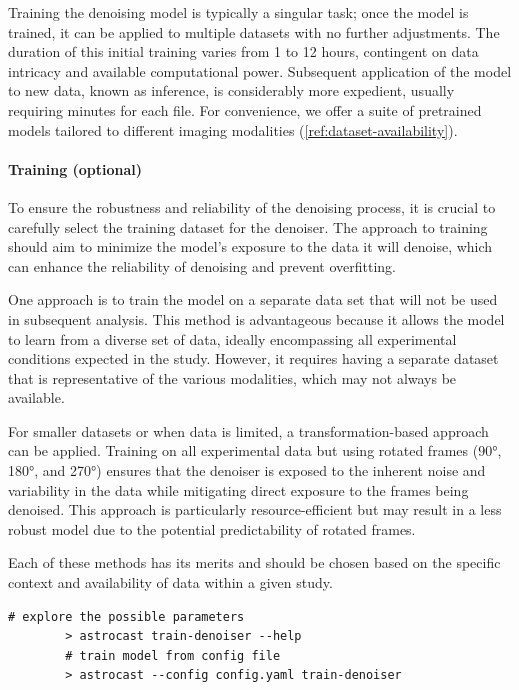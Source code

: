 \documentclass[utf8]{FrontiersinHarvard}
\begin{document}
    Training the denoising model is typically a singular task; once the model is trained, it can be applied to multiple datasets with no further adjustments. The duration of this initial training varies from 1 to 12 hours, contingent on data intricacy and available computational power. Subsequent application of the model to new data, known as inference, is considerably more expedient, usually requiring minutes for each file. For convenience, we offer a suite of pretrained models tailored to different imaging modalities (\ref{ref:dataset-availability}).

    \paragraph{Training (optional)}

    To ensure the robustness and reliability of the denoising process, it is crucial to carefully select the training dataset for the denoiser. The approach to training should aim to minimize the model's exposure to the data it will denoise, which can enhance the reliability of denoising and prevent overfitting.

    One approach is to train the model on a separate data set that will not be used in subsequent analysis. This method is advantageous because it allows the model to learn from a diverse set of data, ideally encompassing all experimental conditions expected in the study. However, it requires having a separate dataset that is representative of the various modalities, which may not always be available.

    For smaller datasets or when data is limited, a transformation-based approach can be applied. Training on all experimental data but using rotated frames (90°, 180°, and 270°) ensures that the denoiser is exposed to the inherent noise and variability in the data while mitigating direct exposure to the frames being denoised. This approach is particularly resource-efficient but may result in a less robust model due to the potential predictability of rotated frames.

    Each of these methods has its merits and should be chosen based on the specific context and availability of data within a given study.

    \begin{lstlisting}[style=bashStyle]
        # explore the possible parameters
        > astrocast train-denoiser --help
        # train model from config file
        > astrocast --config config.yaml train-denoiser
    \end{lstlisting}
\end{document}
